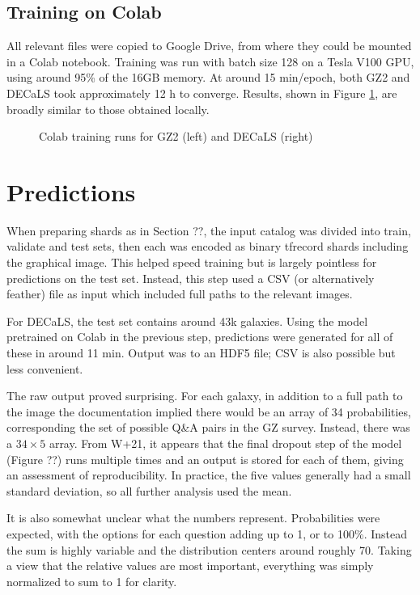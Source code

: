 \documentclass[preprint]{aastex631}
\newcommand{\todo}{\color{red}{TODO}\color{black}\hspace{2mm}}
\begin{document}
\subsection{Training on Colab}

All relevant files were copied to Google Drive, from where they could be mounted in a Colab notebook. Training was run with batch size 128 on a Tesla V100 GPU, using around 95\% of the 16GB memory. At around 15 min/epoch, both GZ2 and DECaLS took approximately 12 h to converge. Results, shown in Figure \ref{fig:train_colab}, are broadly similar to those obtained locally.

\begin{figure}
	\caption{Colab training runs for GZ2 (left) and DECaLS (right) \label{fig:train_colab}}
\end{figure}


\section{Predictions}

When preparing shards as in Section \todo ??, the input catalog was divided into train, validate and test sets, then each was encoded as binary tfrecord shards including the graphical image. This helped speed training but is largely pointless for predictions on the test set. Instead, this step used a CSV (or alternatively feather) file as input which included full paths to the relevant images.

For DECaLS, the test set contains around 43k galaxies. Using the model pretrained on Colab in the previous step, predictions were generated for all of these in around 11 min. Output was to an HDF5 file; CSV is also possible but less convenient.

The raw output proved surprising. For each galaxy, in addition to a full path to the image the documentation implied there would be an array of 34 probabilities, corresponding the set of possible Q\&A pairs in the GZ survey. Instead, there was a $34 \times 5$ array. From W+21, it appears that the final dropout step of the model (Figure \todo ??) runs multiple times and an output is stored for each of them, giving an assessment of reproducibility. In practice, the five values generally had a small standard deviation, so all further analysis used the mean.

It is also somewhat unclear what the numbers represent. Probabilities were expected, with the options for each question adding up to 1, or to 100\%. Instead the sum is highly variable and the distribution centers around roughly 70. Taking a view that the relative values are most important, everything was simply normalized to sum to 1 for clarity. 
\end{document}
